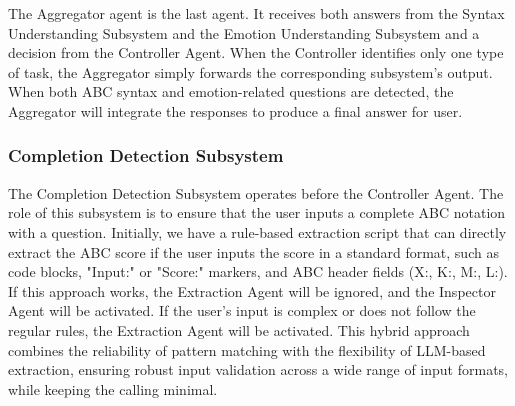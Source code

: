 \documentclass[sigconf]{acmart}
\begin{document}
The Aggregator agent is the last agent. It receives both answers from the Syntax Understanding Subsystem and the Emotion Understanding Subsystem and a decision from the Controller Agent. When the Controller identifies only one type of task, the Aggregator simply forwards the corresponding subsystem’s output.  When both ABC syntax and emotion-related questions are detected, the Aggregator will integrate the responses to produce a final answer for user.



\subsubsection{Completion Detection Subsystem}
The Completion Detection Subsystem operates before the Controller Agent. The role of this subsystem is to ensure that the user inputs a complete ABC notation with a question. Initially, we have a rule-based extraction script that can directly extract the ABC score if the user inputs the score in a standard format, such as code blocks, "Input:" or "Score:" markers, and ABC header fields (X:, K:, M:, L:). If this approach works, the Extraction Agent will be ignored, and the Inspector Agent will be activated. If the user's input is complex or does not follow the regular rules, the Extraction Agent will be activated. This hybrid approach combines the reliability of pattern matching with the flexibility of LLM-based extraction, ensuring robust input validation across a wide range of input formats, while keeping the calling minimal.
\end{document}
